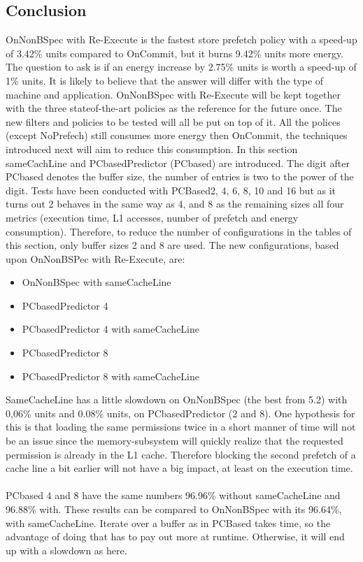 \subsection{Conclusion}
OnNonBSpec with Re-Execute is the fastest store prefetch policy with a speed-up of 3.42\% units compared to OnCommit, but it burns 9.42\% units more energy. The
question to ask is if an energy increase by 2.75\% units is worth a speed-up of 1\%
units. It is likely to believe that the answer will differ with the type of machine and
application. OnNonBSpec with Re-Execute will be kept together with the three stateof-the-art policies as the reference for the future once. The new filters and policies to
be tested will all be put on top of it. All the polices (except NoPrefech) still consumes
more energy then OnCommit, the techniques introduced next will aim to reduce this
consumption.
In this section sameCachLine and PCbasedPredictor (PCbased) are introduced. The  digit after PCbased denotes the buffer size, the number of entries is two to the power
of the digit. Tests have been conducted with PCBased2, 4, 6, 8, 10 and 16 but as it
turns out 2 behaves in the same way as 4, and 8 as the remaining sizes all four
metrics (execution time, L1 accesses, number of prefetch and energy consumption).
Therefore, to reduce the number of configurations in the tables of this section, only
buffer sizes 2 and 8 are used. The new configurations, based upon OnNonBSPec with
Re-Execute, are:
\begin{itemize}
    \item OnNonBSpec with sameCacheLine
    \item PCbasedPredictor 4
    \item PCbasedPredictor 4 with sameCacheLine
    \item PCbasedPredictor 8
    \item PCbasedPredictor 8 with sameCacheLine
\end{itemize}
\resExtime
{}
 SameCacheLine has a little slowdown on OnNonBSpec (the best from 5.2) with
0,06\% units and 0.08\% units, on PCbasedPredictor (2 and 8). One hypothesis for this
is that loading the same permissions twice in a short manner of time will not be an
issue since the memory-subsystem will quickly realize that the requested permission
is already in the L1 cache. Therefore blocking the second prefetch of a cache line a
bit earlier will not have a big impact, at least on the execution time.
\\ \\ 
PCbased 4 and 8 have the same numbers 96.96\% without sameCacheLine and 96.88\% with. These results can be compared to OnNonBSpec with its 96.64\%, with sameCacheLine. Iterate over a buffer as in PCBased takes time, so the advantage of doing
that has to pay out more at runtime. Otherwise, it will end up with a slowdown as here.

